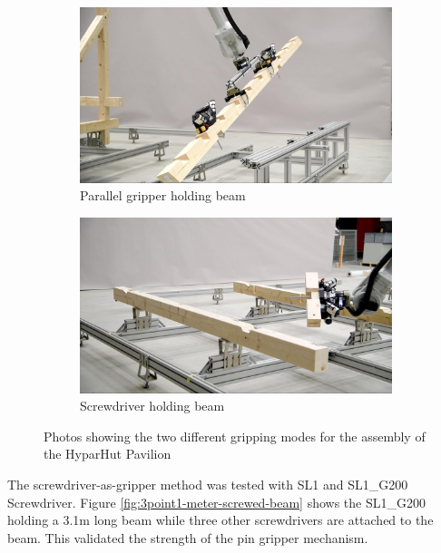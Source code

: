 \begin{figure}[!h]
    \centering
    \begin{subfigure}[b]{0.49\textwidth}
        \centering
        \includegraphics[width=\textwidth]{images/7b/img26.jpg}
        \caption{Parallel gripper holding beam}
        \label{fig:parallel-gripper-holding-beam}
    \end{subfigure}
    \hfill
    \begin{subfigure}[b]{0.49\textwidth}
        \centering
        \includegraphics[width=\textwidth]{images/7b/img27.jpg}
        \caption{Screwdriver holding beam}
        \label{fig:screwdriver-holding-beam}
    \end{subfigure}
    \caption{Photos showing the two different gripping modes for the assembly of the HyparHut Pavilion}
    \label{fig:two-gripping-modes-hyparhut-pavilion}
\end{figure}

The screwdriver-as-gripper method was tested with SL1 and SL1\_G200 Screwdriver. Figure \ref{fig:3point1-meter-screwed-beam} shows the SL1\_G200 holding a 3.1m long beam while three other screwdrivers are attached to the beam. This validated the strength of the pin gripper mechanism.

